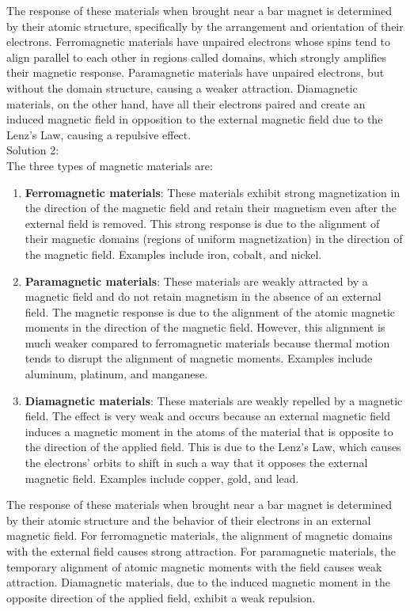 \documentclass[a4paper,11pt]{article}
\begin{document}
The response of these materials when brought near a bar magnet is determined by their atomic structure, specifically by the arrangement and orientation of their electrons. Ferromagnetic materials have unpaired electrons whose spins tend to align parallel to each other in regions called domains, which strongly amplifies their magnetic response. Paramagnetic materials have unpaired electrons, but without the domain structure, causing a weaker attraction. Diamagnetic materials, on the other hand, have all their electrons paired and create an induced magnetic field in opposition to the external magnetic field due to the Lenz's Law, causing a repulsive effect. \\ 

\noindent Solution 2: \\ 

The three types of magnetic materials are:

\begin{enumerate}
    \item \textbf{Ferromagnetic materials}: These materials exhibit strong magnetization in the direction of the magnetic field and retain their magnetism even after the external field is removed. This strong response is due to the alignment of their magnetic domains (regions of uniform magnetization) in the direction of the magnetic field. Examples include iron, cobalt, and nickel.
    \item \textbf{Paramagnetic materials}: These materials are weakly attracted by a magnetic field and do not retain magnetism in the absence of an external field. The magnetic response is due to the alignment of the atomic magnetic moments in the direction of the magnetic field. However, this alignment is much weaker compared to ferromagnetic materials because thermal motion tends to disrupt the alignment of magnetic moments. Examples include aluminum, platinum, and manganese.
    \item \textbf{Diamagnetic materials}: These materials are weakly repelled by a magnetic field. The effect is very weak and occurs because an external magnetic field induces a magnetic moment in the atoms of the material that is opposite to the direction of the applied field. This is due to the Lenz's Law, which causes the electrons' orbits to shift in such a way that it opposes the external magnetic field. Examples include copper, gold, and lead.
\end{enumerate}

The response of these materials when brought near a bar magnet is determined by their atomic structure and the behavior of their electrons in an external magnetic field. For ferromagnetic materials, the alignment of magnetic domains with the external field causes strong attraction. For paramagnetic materials, the temporary alignment of atomic magnetic moments with the field causes weak attraction. Diamagnetic materials, due to the induced magnetic moment in the opposite direction of the applied field, exhibit a weak repulsion. \\ 
\end{document}

